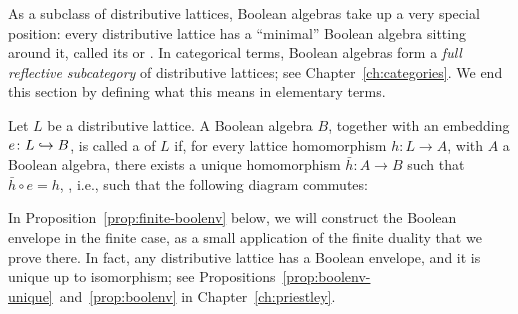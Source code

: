 As a subclass of distributive lattices, Boolean algebras take up a very special position: every distributive lattice has a ``minimal'' Boolean algebra sitting around it, called its  or . In categorical terms, Boolean algebras form a \emph{full reflective subcategory} of distributive lattices; see Chapter~\ref{ch:categories}. We end this section by defining what this means in elementary terms. 
\begin{definition}\label{def:booleanenvelope}
Let $L$ be a distributive lattice. A Boolean algebra $B$, together with an embedding $e \colon L \hookrightarrow B$, is called a  of $L$ if, for every lattice homomorphism $h \colon L \to A$, with $A$ a Boolean algebra, there exists a unique homomorphism $\bar{h} \colon A \to B$ such that $\bar{h} \circ e = h$, , i.e., such that the following diagram commutes:
\begin{center}
\end{center}
\end{definition}
In Proposition~\ref{prop:finite-boolenv} below, we will construct the Boolean envelope in the finite case, as a small application of the finite duality that we prove there. In fact, any distributive lattice has a Boolean envelope, and it is unique up to isomorphism; see Propositions~\ref{prop:boolenv-unique}~and~\ref{prop:boolenv} in Chapter~\ref{ch:priestley}.


